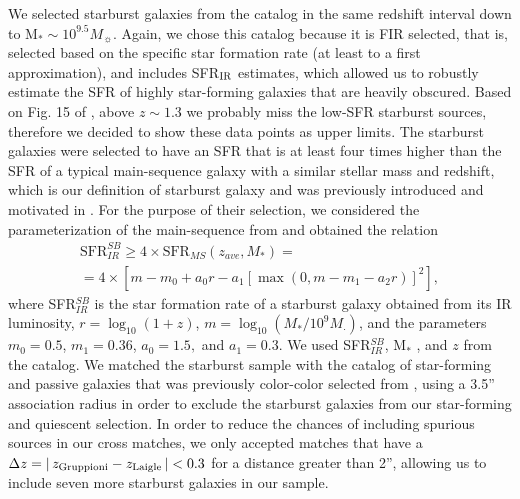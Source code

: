We selected starburst galaxies from the \citet{2013MNRAS.432...23G} catalog in the same redshift interval down to M$_*\sim 10^{9.5} M_\sun$. Again, we chose this catalog because it is FIR selected, that is, selected based on the specific star formation rate (at least to a first approximation), and includes SFR$_{\rm IR}$ estimates, which allowed us to robustly estimate the SFR of highly star-forming galaxies that are heavily obscured. 
Based on Fig. 15 of \citet{2013MNRAS.432...23G}, above $z\sim1.3$ we probably miss the low-SFR starburst sources, therefore we decided to show these data points as upper limits.
 The starburst galaxies were selected to have an SFR that is at least four times higher than the SFR of a typical main-sequence galaxy with a similar stellar mass and redshift, which is our definition of starburst galaxy and was previously introduced and motivated in \citet{2011ApJ...739L..40R}.
For the purpose of their selection, we considered the parameterization of the main-sequence from \citet{2015A&A...575A..74S} and obtained the relation
\begin{multline}  \label{eq:SFR_thresh}
\textrm{SFR}_{IR}^{SB} \geq 4 \times \textrm{SFR}_{MS}(z_{ave},M_*)=\\
=4 \times \left[m-m_0+a_0r-a_1[\max(0,m-m_1-a_2r)]^2 \right],
\end{multline}
where SFR$_{IR}^{SB}$ is the star formation rate of a starburst galaxy obtained from its IR luminosity, $r=\log_{10}(1+z)$, $m=\log_{10}(M_*/10^9M_\cdot)$, and the parameters $m_0=0.5$, $m_1=0.36$, $a_0=1.5,$ and $a_1=0.3$.
We used SFR$_{IR}^{SB}$, M$_*$ , and $z$ from the \citet{2013MNRAS.432...23G} catalog.
We matched the starburst sample with the catalog of star-forming and passive galaxies that was previously color-color selected from \citet{2016ApJS..224...24L}, using a 3.5'' association radius in order to exclude the starburst galaxies from our star-forming and quiescent selection. In order to reduce the chances of including spurious sources in our cross matches, we only accepted matches that have a $\Delta z = |\, z_{\rm Gruppioni} - z_{\rm Laigle} \,|<0.3$ for a distance greater than 2'', allowing us to include seven more starburst galaxies in our sample.
